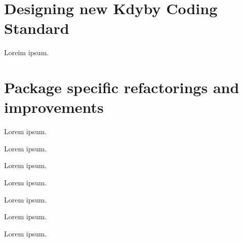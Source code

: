 \section{Designing new Kdyby Coding Standard}

Loreim ipsum.

\section{Package specific refactorings and improvements}


Lorem ipsum.


Lorem ipsum.


Lorem ipsum.

%


Lorem ipsum.


Lorem ipsum.


Lorem ipsum.


Lorem ipsum.
